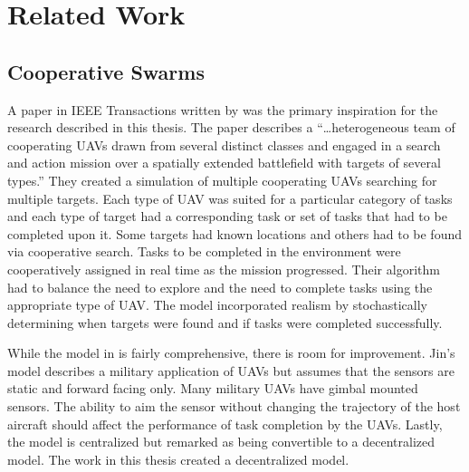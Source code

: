 \chapter{Related Work}
\label{chap:relWork}
\section{Cooperative Swarms}

A paper in IEEE Transactions written by \cite{jin} was the primary inspiration for the research described in this thesis.  The paper describes a ``\ldots heterogeneous team of cooperating UAVs drawn from several distinct classes and engaged in a search and action mission over a spatially extended battlefield with targets of several types.'' They created a simulation of multiple cooperating UAVs searching for multiple targets.  Each type of UAV was suited for a particular category of tasks and each type of target had a corresponding task or set of tasks that had to be completed upon it.  Some targets had known locations and others had to be found via cooperative search.  Tasks to be completed in the environment were cooperatively assigned in real time as the mission progressed.  Their algorithm had to balance the need to explore and the need to complete tasks using the appropriate type of UAV.  The model incorporated realism by stochastically determining when targets were found and if tasks were completed successfully.

While the model in \cite{jin} is fairly comprehensive, there is room for improvement.  Jin's model describes a military application of UAVs but assumes that the sensors are static and forward facing only.  Many military UAVs have gimbal mounted sensors.  The ability to aim the sensor without changing the trajectory of the host aircraft should affect the performance of task completion by the UAVs.  Lastly, the model is centralized but remarked as being convertible to a decentralized model.  The work in this thesis created a decentralized model.


